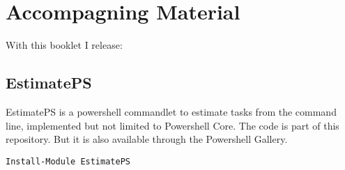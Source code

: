 \hypertarget{accompagning-material}{%
\section{Accompagning Material}\label{accompagning-material}}

With this booklet I release:

\hypertarget{estimateps}{%
\subsection{EstimatePS}\label{estimateps}}

EstimatePS is a powershell commandlet to estimate tasks from the command
line, implemented but not limited to Powershell Core. The code is part
of this repository. But it is also available through the Powershell
Gallery.

\begin{verbatim}
Install-Module EstimatePS
\end{verbatim}
